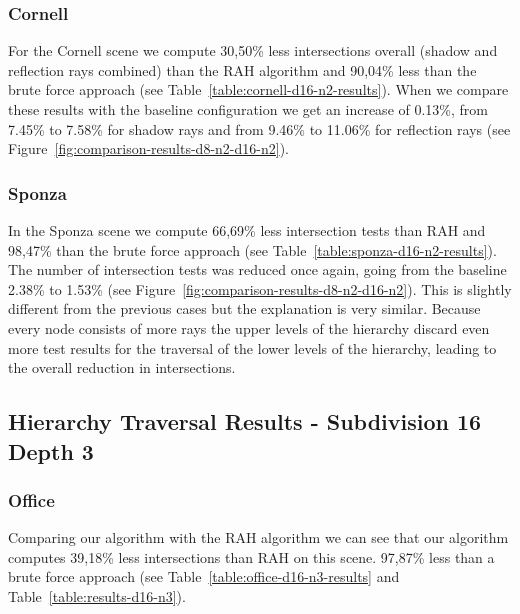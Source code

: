 \subsubsection{Cornell}

For the Cornell scene we compute 30,50\% less intersections overall (shadow and reflection rays combined) than the RAH algorithm and 90,04\% less than the brute force approach (see Table~\ref{table:cornell-d16-n2-results}). When we compare these results with the baseline configuration we get an increase of 0.13\%, from 7.45\% to 7.58\% for shadow rays and from 9.46\% to 11.06\% for reflection rays (see Figure~\ref{fig:comparison-results-d8-n2-d16-n2}).

\subsubsection{Sponza}

In the Sponza scene we compute 66,69\% less intersection tests than RAH and 98,47\% than the brute force approach (see Table~\ref{table:sponza-d16-n2-results}). The number of intersection tests was reduced once again, going from the baseline 2.38\% to 1.53\% (see Figure~\ref{fig:comparison-results-d8-n2-d16-n2}). This is slightly different from the previous cases but the explanation is very similar. Because every node consists of more rays the upper levels of the hierarchy discard even more test results for the traversal of the lower levels of the hierarchy, leading to the overall reduction in intersections.


\pagebreak
\subsection{Hierarchy Traversal Results - Subdivision 16 Depth 3}

\subsubsection{Office}


Comparing our algorithm with the RAH algorithm we can see that our algorithm computes 39,18\% less intersections than RAH on this scene. 97,87\% less than a brute force approach (see Table~\ref{table:office-d16-n3-results} and Table~\ref{table:results-d16-n3}).

